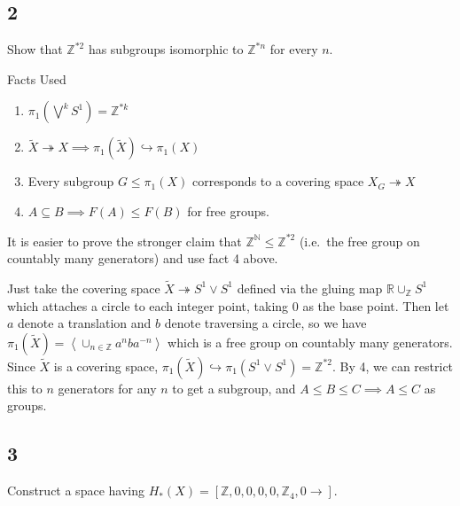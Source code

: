 \hypertarget{section-6}{%
\subsection{2}\label{section-6}}

Show that \({\mathbb{Z}}^{\ast 2}\) has subgroups isomorphic to
\({\mathbb{Z}}^{\ast n}\) for every \(n\).

\begin{solution}

Facts Used

\begin{enumerate}
\def\labelenumi{\arabic{enumi}.}
\tightlist
\item
  \(\pi_1(\bigvee^k S^1) = {\mathbb{Z}}^{\ast k}\)
\item
  \(\tilde X \twoheadrightarrow X \implies \pi_1(\tilde X) \hookrightarrow\pi_1(X)\)
\item
  Every subgroup \(G \leq \pi_1(X)\) corresponds to a covering space
  \(X_G \twoheadrightarrow X\)
\item
  \(A \subseteq B \implies F(A) \leq F(B)\) for free groups.
\end{enumerate}

It is easier to prove the stronger claim that
\({\mathbb{Z}}^{\mathbb{N}}\leq {\mathbb{Z}}^{\ast 2}\) (i.e.~the free
group on countably many generators) and use fact 4 above.

Just take the covering space
\(\tilde X \twoheadrightarrow S^1 \vee S^1\) defined via the gluing map
\({\mathbb{R}}\cup_{{\mathbb{Z}}} S^1\) which attaches a circle to each
integer point, taking 0 as the base point. Then let \(a\) denote a
translation and \(b\) denote traversing a circle, so we have
\(\pi_1(\tilde X) = \left<\cup_{n\in{\mathbb{Z}}}a^nba^{-n}\right>\)
which is a free group on countably many generators. Since \(\tilde X\)
is a covering space,
\(\pi_1(\tilde X) \hookrightarrow\pi_1(S^1 \vee S^1) = {\mathbb{Z}}^{\ast 2}\).
By 4, we can restrict this to \(n\) generators for any \(n\) to get a
subgroup, and \(A\leq B \leq C \implies A \leq C\) as groups.

\end{solution}

\hypertarget{section-7}{%
\subsection{3}\label{section-7}}

Construct a space having
\(H_*(X) = [{\mathbb{Z}}, 0, 0, 0, 0, {\mathbb{Z}}_4, 0\rightarrow]\).

